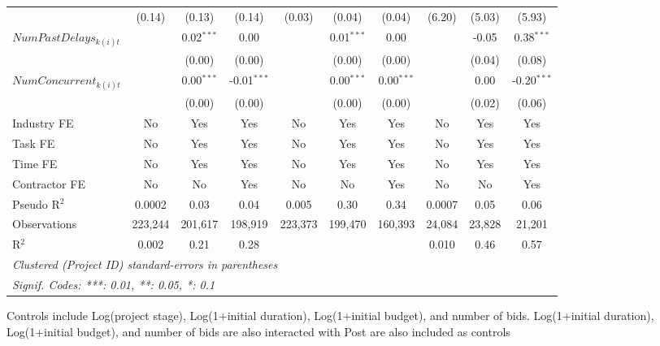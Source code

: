 \documentclass[
]{article}
\begin{document}
\begin{table}[htbp]
\begin{tabular}{lccccccccc}
                              & (0.14)        & (0.13)        & (0.14)        & (0.03)        & (0.04)        & (0.04)       & (6.20)         & (5.03)         & (5.93)\\   
      $NumPastDelays_{k(i)t}$ &               & 0.02$^{***}$  & 0.00          &               & 0.01$^{***}$  & 0.00         &                & -0.05          & 0.38$^{***}$\\   
                              &               & (0.00)        & (0.00)        &               & (0.00)        & (0.00)       &                & (0.04)         & (0.08)\\   
      $NumConcurrent_{k(i)t}$ &               & 0.00$^{***}$  & -0.01$^{***}$ &               & 0.00$^{***}$  & 0.00$^{***}$ &                & 0.00           & -0.20$^{***}$\\   
                              &               & (0.00)        & (0.00)        &               & (0.00)        & (0.00)       &                & (0.02)         & (0.06)\\   
      \midrule 
      Industry FE             & No            & Yes           & Yes           & No            & Yes           & Yes          & No             & Yes            & Yes\\  
      Task FE                 & No            & Yes           & Yes           & No            & Yes           & Yes          & No             & Yes            & Yes\\  
      Time FE                 & No            & Yes           & Yes           & No            & Yes           & Yes          & No             & Yes            & Yes\\  
      Contractor FE           & No            & No            & Yes           & No            & No            & Yes          & No             & No             & Yes\\  
      Pseudo R$^2$            & 0.0002        & 0.03          & 0.04          & 0.005         & 0.30          & 0.34         & 0.0007         & 0.05           & 0.06\\  
      Observations            & 223,244       & 201,617       & 198,919       & 223,373       & 199,470       & 160,393      & 24,084         & 23,828         & 21,201\\  
      R$^2$                   & 0.002         & 0.21          & 0.28          &               &               &              & 0.010          & 0.46           & 0.57\\  
      \midrule
      \multicolumn{10}{l}{\emph{Clustered (Project ID) standard-errors in parentheses}}\\
      \multicolumn{10}{l}{\emph{Signif. Codes: ***: 0.01, **: 0.05, *: 0.1}}\\
   \end{tabular}
   
   \par \raggedright 
   Controls include Log(project stage), Log(1+initial duration), Log(1+initial budget), and number of bids. Log(1+initial duration), Log(1+initial budget), and number of bids are also interacted with Post are also included as controls
\end{table}
\end{document}
